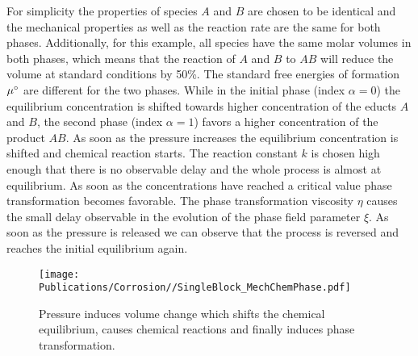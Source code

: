 For simplicity the properties of species $A$ and $B$ are chosen to be identical and the mechanical properties as well as the reaction rate are the same for both phases. Additionally, for this example, all species have the same molar volumes in both phases, which means that the reaction of $A$ and $B$ to $AB$ will reduce the volume at standard conditions by 50\%. The standard free energies of formation $\mu^{\circ}$ are different for the two phases. While in the initial phase (index $\alpha=0$) the equilibrium concentration is shifted towards higher concentration of the educts $A$ and $B$, the second phase (index $\alpha=1$) favors a higher concentration of the product $AB$. As soon as the pressure increases the equilibrium concentration is shifted and chemical reaction starts. The reaction constant $k$ is chosen high enough that there is no observable delay and the whole process is almost at equilibrium. As soon as the concentrations have reached a critical value phase transformation becomes favorable. The phase transformation viscosity $\eta$ causes the small delay observable in the evolution of the phase field parameter $\xi$. As soon as the pressure is released we can observe that the process is reversed and reaches the initial equilibrium again. 

\begin{figure}[h!]
  \centering
  \texttt{[image: Publications/Corrosion//SingleBlock\_MechChemPhase.pdf]}
  \caption[]{Pressure induces volume change which shifts the chemical equilibrium, causes chemical reactions and finally induces phase transformation.}
  \label{fig:SingleMechChemPhase}
\end{figure}

